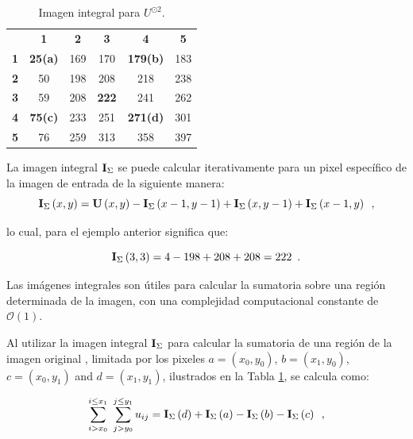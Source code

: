 {\begin{table}
\caption{Imagen integral para $U^{\odot2}$.\label{table:integralcuad}}
\begin{center}
\renewcommand{\arraystretch}{1.4}
\setlength\tabcolsep{3pt}
{
\begin{tabular}{cc|ccc|c}
 & \multicolumn{1}{c}{\textbf{1}} & \textbf{2} & \textbf{3} & \multicolumn{1}{c}{\textbf{4}} & \textbf{5}\tabularnewline
\textbf{1} & \multicolumn{1}{c}{\textbf{25(a)}} & 169 & 170 & \multicolumn{1}{c}{\textbf{179(b)}} & 183\tabularnewline
\cline{3-5} 
\textbf{2} & 50 & 198 & 208 & 218 & 238\tabularnewline
\textbf{3} & 59 & 208 & \textbf{222} & 241 & 262\tabularnewline
\textbf{4} & \textbf{75(c)} & 233 & 251 & \textbf{271(d)} & 301\tabularnewline
\cline{3-5} 
\textbf{5} & \multicolumn{1}{c}{76} & 259 & 313 & \multicolumn{1}{c}{358} & 397\tabularnewline
\end{tabular}
}
\par\end{center}
\end{table}


La imagen integral $\mathbf{I}_{\Sigma}$ se puede calcular iterativamente para un pixel espec\'ifico de la imagen de entrada  de la siguiente manera: 
\begin{equation}
\mathbf{I}_{\Sigma}\left(x,y\right)=\mathbf{U}\left(x,y\right)-\mathbf{I}_{\Sigma}\left(x-1,y-1\right)+\mathbf{I}_{\Sigma}\left(x,y-1\right)
+\mathbf{I}_{\Sigma}\left(x-1,y\right) \enspace ,
\end{equation}

lo cual, para el ejemplo anterior significa que:

\begin{equation}
\mathbf{I}_{\Sigma}\left(3,3\right)=4-198+208+208=222 \enspace .
\end{equation}

Las im\'agenes integrales son \'utiles para calcular la sumatoria sobre una regi\'on determinada de la imagen, con una complejidad computacional constante de $\mathcal{O}(1)$. 

Al utilizar la imagen integral $\mathbf{I}_{\Sigma}$ para calcular la sumatoria de una regi\'on de la imagen original , limitada por los pixeles $a=\left(x_{0},y_{0}\right)$,
$b=\left(x_{1},y_{0}\right)$, $c=\left(x_{0},y_{1}\right)$ and $d=\left(x_{1},y_{1}\right)$, ilustrados en la Tabla \ref{table:integralcuad}, se calcula como: 

\begin{equation}
\sum_{i>x_{0}}^{i\leq x_{1}}~\sum_{j>y_{0}}^{j\leq y_{1}}u_{ij}=\mathbf{I}_{\Sigma}\left(d\right)+\mathbf{I}_{\Sigma}\left(a\right)-\mathbf{I}_{\Sigma}\left(b\right)-\mathbf{I}_{\Sigma}\left(c\right) \enspace ,
\end{equation}

}
